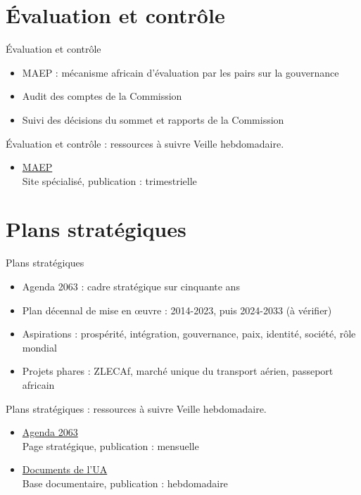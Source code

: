\documentclass[aspectratio=169,11pt]{beamer}
\begin{document}
\section{Évaluation et contrôle}
\begin{frame}{Évaluation et contrôle}
\begin{itemize}
\item MAEP : mécanisme africain d'évaluation par les pairs sur la gouvernance
\item Audit des comptes de la Commission
\item Suivi des décisions du sommet et rapports de la Commission
\end{itemize}
\end{frame}

\begin{frame}{Évaluation et contrôle : ressources à suivre}
\small
Veille hebdomadaire.
\begin{itemize}
\item \href{https://aprm-au.org}{MAEP}\\{\footnotesize Site spécialisé, publication : trimestrielle}
\end{itemize}
\end{frame}

\section{Plans stratégiques}
\begin{frame}{Plans stratégiques}
\begin{itemize}
\item Agenda 2063 : cadre stratégique sur cinquante ans
\item Plan décennal de mise en œuvre : 2014-2023, puis 2024-2033 (à vérifier)
\item Aspirations : prospérité, intégration, gouvernance, paix, identité, société, rôle mondial
\item Projets phares : ZLECAf, marché unique du transport aérien, passeport africain
\end{itemize}
\end{frame}

\begin{frame}{Plans stratégiques : ressources à suivre}
\small
Veille hebdomadaire.
\begin{itemize}
\item \href{https://au.int/en/agenda2063/overview}{Agenda 2063}\\{\footnotesize Page stratégique, publication : mensuelle}
\item \href{https://au.int/en/documents}{Documents de l'UA}\\{\footnotesize Base documentaire, publication : hebdomadaire}
\end{itemize}
\end{frame}
\end{document}
